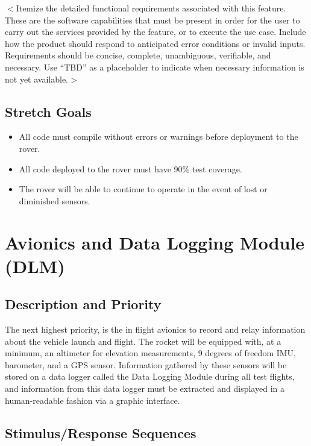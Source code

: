 \documentclass{scrreprt}
\begin{document}
$<$Itemize the detailed functional requirements associated with this feature.  
These are the software capabilities that must be present in order for the user 
to carry out the services provided by the feature, or to execute the use case.  
Include how the product should respond to anticipated error conditions or 
invalid inputs. Requirements should be concise, complete, unambiguous, 
verifiable, and necessary. Use “TBD” as a placeholder to indicate when necessary 
information is not yet available.$>$

\subsection{Stretch Goals}
\begin{itemize}
\item All code must compile without errors or warnings before deployment to the rover.
\item All code deployed to the rover must have 90\% test coverage.
\item The rover will be able to continue to operate in the event of lost or diminished sensors.
\end{itemize}


\section{Avionics and Data Logging Module (DLM)}
\subsection{Description and Priority}
The next highest priority, is the in flight avionics to record and relay information about the vehicle launch and flight.
The rocket will be equipped with, at a minimum, an altimeter for elevation measurements, 9 degrees of freedom IMU, barometer, and a GPS sensor. Information gathered by these sensors will be stored on a data logger called the Data Logging Module during all test flights, and information from this data logger must be extracted and displayed in a human-readable fashion via a graphic interface. 
\subsection{Stimulus/Response Sequences}
\end{document}
